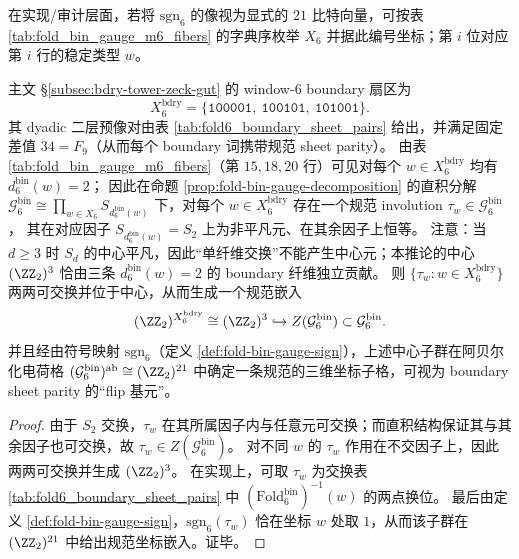\begin{remark}[\texorpdfstring{$m=6$}{m=6} 的纤维奇偶荷坐标顺序（可审计）]\label{rem:fold-bin-gauge-sign-coordinates}
在实现/审计层面，若将 \(\mathrm{sgn}_6\) 的像视为显式的 \(21\) 比特向量，可按表 \ref{tab:fold_bin_gauge_m6_fibers} 的字典序枚举 \(X_6\) 并据此编号坐标；第 \(i\) 位对应第 \(i\) 行的稳定类型 \(w\)。

\end{remark}

\begin{corollary}\label{cor:fold-bin-boundary-center-z2}
主文 \S\ref{subsec:bdry-tower-zeck-gut} 的 window-\(6\) boundary 扇区为
\[
X^{\mathrm{bdry}}_6=\{\texttt{100001},\ \texttt{100101},\ \texttt{101001}\}.
\]
其 dyadic 二层预像对由表 \ref{tab:fold6_boundary_sheet_pairs} 给出，并满足固定差值 \(34=F_9\)（从而每个 boundary 词携带规范 sheet parity）。
由表 \ref{tab:fold_bin_gauge_m6_fibers}（第 \(15,18,20\) 行）可见对每个 \(w\in X^{\mathrm{bdry}}_6\) 均有 \(d^{\mathrm{bin}}_6(w)=2\)；
因此在命题 \ref{prop:fold-bin-gauge-decomposition} 的直积分解
\(
\mathcal{G}^{\mathrm{bin}}_6\cong \prod_{w\in X_6}S_{d^{\mathrm{bin}}_6(w)}
\)
下，对每个 \(w\in X^{\mathrm{bdry}}_6\) 存在一个规范 involution \(\tau_w\in \mathcal{G}^{\mathrm{bin}}_6\)，
其在对应因子 \(S_{d^{\mathrm{bin}}_6(w)}=S_2\) 上为非平凡元、在其余因子上恒等。
注意：当 \(d\ge 3\) 时 \(S_d\) 的中心平凡，因此“单纤维交换”不能产生中心元；本推论的中心 \((\ZZ_2)^3\) 恰由三条 \(d^{\mathrm{bin}}_6(w)=2\) 的 boundary 纤维独立贡献。
则 \(\{\tau_w:w\in X^{\mathrm{bdry}}_6\}\) 两两可交换并位于中心，从而生成一个规范嵌入
\[
(\ZZ_2)^{X^{\mathrm{bdry}}_6}\cong (\ZZ_2)^3\hookrightarrow Z(\mathcal{G}^{\mathrm{bin}}_6)\subset \mathcal{G}^{\mathrm{bin}}_6.
\]
并且经由符号映射 \(\mathrm{sgn}_6\)（定义 \ref{def:fold-bin-gauge-sign}），上述中心子群在阿贝尔化电荷格
\(
(\mathcal{G}^{\mathrm{bin}}_6)^{\mathrm{ab}}\cong (\ZZ_2)^{21}
\)
中确定一条规范的三维坐标子格，可视为 boundary sheet parity 的“flip 基元”。
\end{corollary}
\begin{proof}
由于 \(S_2\) 交换，\(\tau_w\) 在其所属因子内与任意元可交换；而直积结构保证其与其余因子也可交换，故 \(\tau_w\in Z(\mathcal{G}^{\mathrm{bin}}_6)\)。
对不同 \(w\) 的 \(\tau_w\) 作用在不交因子上，因此两两可交换并生成 \((\ZZ_2)^3\)。
在实现上，可取 \(\tau_w\) 为交换表 \ref{tab:fold6_boundary_sheet_pairs} 中 \((\mathrm{Fold}^{\mathrm{bin}}_6)^{-1}(w)\) 的两点换位。
最后由定义 \ref{def:fold-bin-gauge-sign}，\(\mathrm{sgn}_6(\tau_w)\) 恰在坐标 \(w\) 处取 \(1\)，从而该子群在 \((\ZZ_2)^{21}\) 中给出规范坐标嵌入。证毕。
\end{proof}

